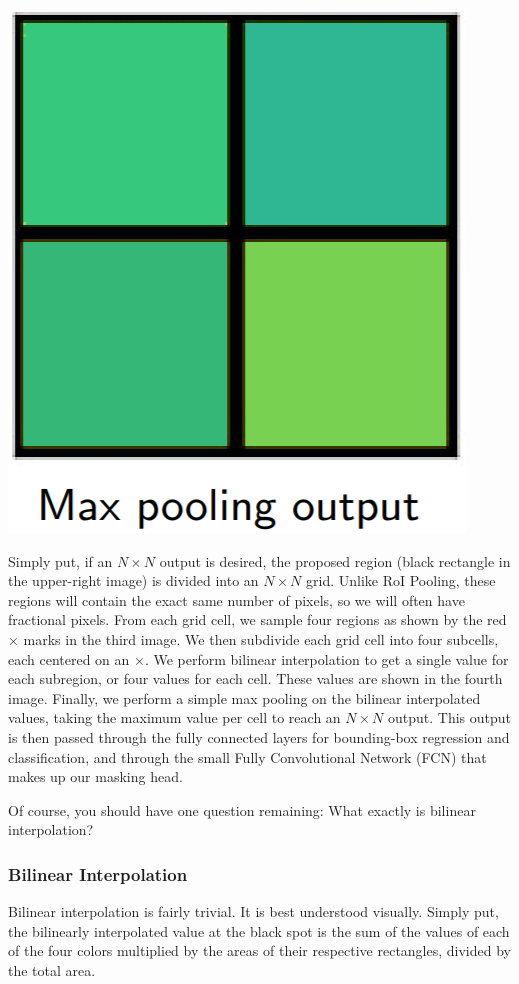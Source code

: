 \documentclass{article}
\begin{document}
\begin{center}
\includegraphics[scale=0.35]{roialign5.PNG}
\end{center}

Simply put, if an $N\times N$ output is desired, the proposed region (black rectangle in the upper-right image) is divided into an $N\times N$ grid. Unlike RoI Pooling, these regions will contain the exact same number of pixels, so we will often have fractional pixels. From each grid cell, we sample four regions as shown by the red $\times$ marks in the third image. We then subdivide each grid cell into four subcells, each centered on an $\times$. We perform bilinear interpolation to get a single value for each subregion, or four values for each cell. These values are shown in the fourth image. Finally, we perform a simple max pooling on the bilinear interpolated values, taking the maximum value per cell to reach an $N\times N$ output. This output is then passed through the fully connected layers for bounding-box regression and classification, and through the small Fully Convolutional Network (FCN) that makes up our masking head.

Of course, you should have one question remaining: What exactly is bilinear interpolation?

\subsubsection{Bilinear Interpolation}
Bilinear interpolation is fairly trivial. It is best understood visually. Simply put, the bilinearly interpolated value at the black spot is the sum of the values of each of the four colors multiplied by the areas of their respective rectangles, divided by the total area.
\end{document}
